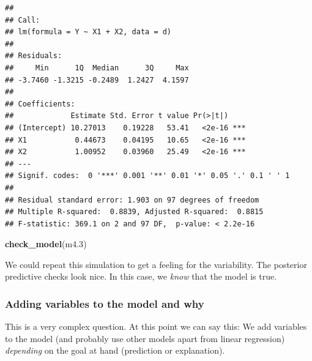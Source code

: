\documentclass[
]{book}
\newenvironment{Shaded}{\begin{snugshade}}{\end{snugshade}}
\newcommand{\FloatTok}[1]{\textcolor[rgb]{0.00,0.00,0.81}{#1}}
\newcommand{\FunctionTok}[1]{\textcolor[rgb]{0.13,0.29,0.53}{\textbf{#1}}}
\newcommand{\NormalTok}[1]{#1}
\begin{document}
\begin{verbatim}
## 
## Call:
## lm(formula = Y ~ X1 + X2, data = d)
## 
## Residuals:
##     Min      1Q  Median      3Q     Max 
## -3.7460 -1.3215 -0.2489  1.2427  4.1597 
## 
## Coefficients:
##             Estimate Std. Error t value Pr(>|t|)    
## (Intercept) 10.27013    0.19228   53.41   <2e-16 ***
## X1           0.44673    0.04195   10.65   <2e-16 ***
## X2           1.00952    0.03960   25.49   <2e-16 ***
## ---
## Signif. codes:  0 '***' 0.001 '**' 0.01 '*' 0.05 '.' 0.1 ' ' 1
## 
## Residual standard error: 1.903 on 97 degrees of freedom
## Multiple R-squared:  0.8839, Adjusted R-squared:  0.8815 
## F-statistic: 369.1 on 2 and 97 DF,  p-value: < 2.2e-16
\end{verbatim}

\begin{Shaded}
\begin{Highlighting}[]
\FunctionTok{check\_model}\NormalTok{(m4}\FloatTok{.3}\NormalTok{)}
\end{Highlighting}
\end{Shaded}

We could repeat this simulation to get a feeling for the variability.
The posterior predictive checks look nice. In this case, we \emph{know} that the model is true.

\subsubsection{Adding variables to the model and why}\label{adding-variables-to-the-model-and-why}

This is a very complex question. At this point we can say this:
We add variables to the model (and probably use
other models apart from linear regression) \emph{depending} on the goal at hand (prediction or explanation).
\end{document}
